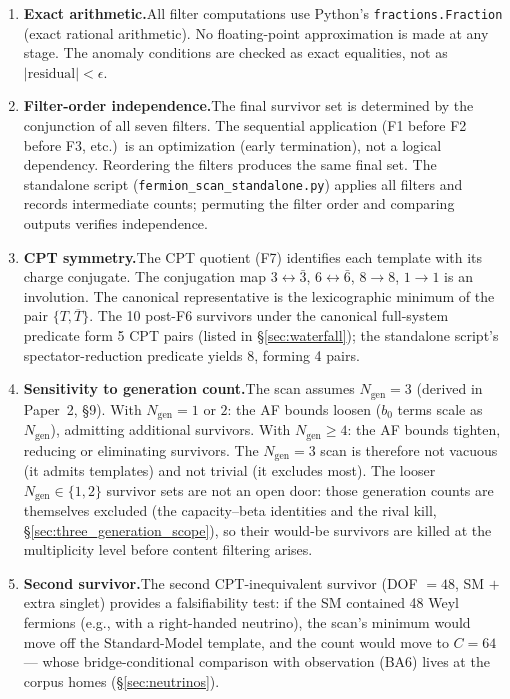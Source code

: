 \documentclass[11pt]{article}
\theoremstyle{definition}
\begin{document}
\begin{enumerate}[nosep]
\item \textbf{Exact arithmetic.}\quad All filter computations use
Python's \texttt{fractions.Fraction} (exact rational arithmetic).  No
floating-point approximation is made at any stage.  The anomaly
conditions are checked as exact equalities, not as
$|\text{residual}| < \epsilon$.

\item \textbf{Filter-order independence.}\quad The final survivor set
is determined by the conjunction of all seven filters.  The sequential
application (F1 before F2 before F3, etc.)\ is an optimization
(early termination), not a logical dependency.  Reordering the filters
produces the same final set.  The standalone script
(\texttt{fermion\_scan\_standalone.py}) applies all filters and records
intermediate counts; permuting the filter order and comparing outputs
verifies independence.

\item \textbf{CPT symmetry.}\quad The CPT quotient (F7) identifies
each template with its charge conjugate.  The conjugation map
$3 \leftrightarrow \bar{3}$, $6 \leftrightarrow \bar{6}$,
$8 \to 8$, $1 \to 1$ is an involution.  The canonical representative
is the lexicographic minimum of the pair $\{T, \overline{T}\}$.  The
10 post-F6 survivors under the canonical full-system predicate form 5
CPT pairs (listed in \S\ref{sec:waterfall}); the standalone script's
spectator-reduction predicate yields 8, forming 4 pairs.

\item \textbf{Sensitivity to generation count.}\quad The scan assumes
$N_{\mathrm{gen}} = 3$ (derived in Paper~2, \S9).  With
$N_{\mathrm{gen}} = 1$ or $2$: the AF bounds loosen ($b_0$ terms
scale as $N_{\mathrm{gen}}$), admitting additional survivors.  With
$N_{\mathrm{gen}} \ge 4$: the AF bounds tighten, reducing or
eliminating survivors.  The $N_{\mathrm{gen}} = 3$ scan is therefore
not vacuous (it admits templates) and not trivial (it excludes most).  The looser $N_{\mathrm{gen}} \in \{1,2\}$ survivor sets are not an open door: those generation counts are themselves excluded (the capacity--beta identities and the rival kill, \S\ref{sec:three_generation_scope}), so their would-be survivors are killed at the multiplicity level before content filtering arises.

\item \textbf{Second survivor.}\quad The second CPT-inequivalent
survivor (DOF $= 48$, SM $+$ extra singlet) provides a
falsifiability test: if the SM contained 48 Weyl fermions (e.g., with
a right-handed neutrino), the scan's minimum would move off the
Standard-Model template, and the count would move to $C = 64$ ---
whose bridge-conditional comparison with observation (BA6) lives at
the corpus homes (\S\ref{sec:neutrinos}).
\end{enumerate}
\end{document}
